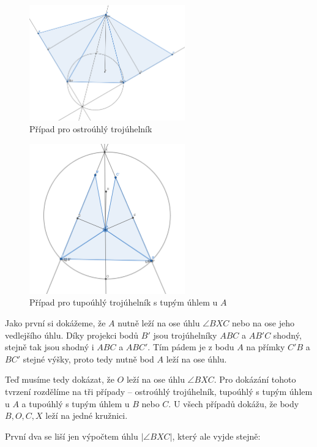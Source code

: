 \documentclass{fkssolpub}
\author{Ondřej Sedláček}
\begin{document}
\begin{figure}[h!]
	\centering
	\includegraphics[width=0.6\textwidth]{4-fig1.png}
	\caption{Případ pro ostroúhlý trojúhelník}
	\label{fig:1}
\end{figure}


\begin{figure}[h!]
	\centering
	\includegraphics[width=0.6\textwidth]{4-fig2.png}
	\caption{Případ pro tupoúhlý trojúhelník s tupým úhlem u $A$}
	\label{fig:2}
\end{figure}

Jako první si dokážeme, že $A$ nutně leží na ose úhlu $\angle BXC$ nebo
na ose jeho vedlejšího úhlu. Díky projekci bodů $B'$ jsou trojúhelníky $ABC$ a
$AB'C$ shodný, stejně tak jsou shodný i
$ABC$ a $ABC'$. Tím pádem je z bodu $A$ na přímky $C'B$ a $BC'$ stejné výšky,
proto tedy nutně bod $A$ leží na ose úhlu.

Teď musíme tedy dokázat, že $O$ leží na ose úhlu $\angle BXC$. Pro dokázání
tohoto tvrzení rozdělíme na tři případy -- ostroúhlý trojúhelník, tupoúhlý s
tupým úhlem u $A$ a tupoúhlý s tupým úhlem u $B$ nebo $C$. U všech případů
dokážu, že body $B, O, C, X$ leží na jedné kružnici.

První dva se liší jen výpočtem úhlu $|\angle BXC|$, který ale vyjde
stejně:
\end{document}

